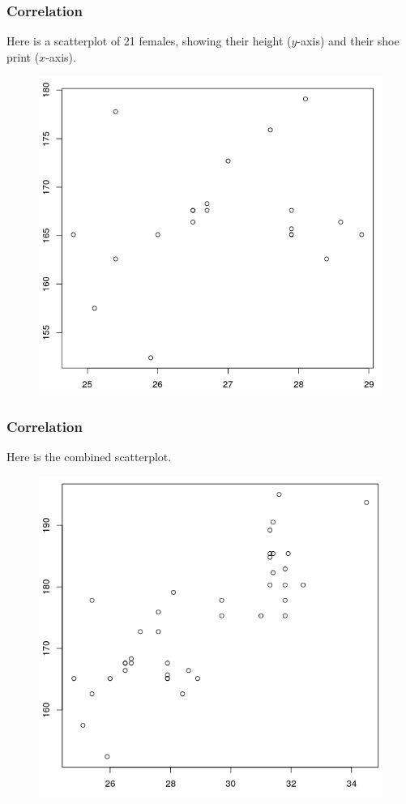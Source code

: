 \documentclass[xcolor=dvipsnames]{beamer}
\begin{document}
\begin{frame}
  \frametitle{Correlation}
  Here is a scatterplot of 21 females, showing their height ($y$-axis)
  and their shoe print ($x$-axis).
  \begin{figure}[h]
    \includegraphics[scale=0.35]{./diagrams/fshoeprintheight.png}
  \end{figure}
\end{frame}

\begin{frame}
  \frametitle{Correlation}
Here is the combined scatterplot.
  \begin{figure}[h]
    \includegraphics[scale=0.35]{./diagrams/mfshoeprintheight.png}
  \end{figure}
\end{frame}
\end{document}
